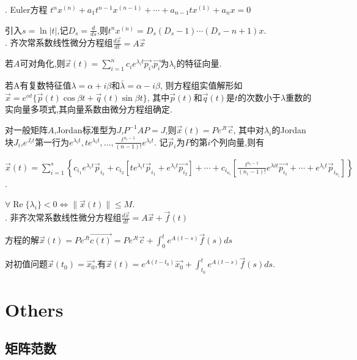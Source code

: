 \documentclass[UTF8]{ctexart}
\begin{document}
. Euler方程
$t^nx^{(n)}+a_1t^{n-1}x^{(n-1)}+\cdots +a_{n-1}tx^{(1)}+a_nx=0$ \par
引入$s=\ln |t|$,记$D_s=\frac{d}{ds}$,则$t^n x^{(n)}=D_s(D_s-1)\cdots (D_s-n+1)x$.
~\\

. 齐次常系数线性微分方程组$\frac{d\vec{x}}{dt}=A\vec{x} $ \par

若$A$可对角化,则$\vec{x}(t)=\sum _{i=1}^n c_i e^{\lambda_i t}\vec{p_i}$,$\vec{p_i}$为$\lambda_i$的特征向量. \par
若A有复数特征值$\lambda=\alpha+i\beta$和$\bar{\lambda}=\alpha-i\beta$,
则方程组实值解形如$\vec{x}=e^{\alpha t}\{\vec{p}(t) \cos \beta t+\vec{q}(t) \sin \beta t\}$,
其中$\vec{p}(t)$和$\vec{q}(t)$是$t$的次数小于$\lambda$重数的实向量多项式,其向量系数由微分方程组确定. \par

对一般矩阵$A$,Jordan标准型为$J$,$P^{-1}AP=J$,则$\vec{x}(t)=Pe^{Jt}\vec{c}$,
其中对$\lambda_i$的Jordan块$J_i$,$e^{J_it}$第一行为$e^{\lambda_it},te^{\lambda_it},\dots ,\frac{t^{n_i-1}}{(n-1)!}e^{\lambda_it}$.
记$\vec{p}_i$为$P$的第$i$个列向量,则有 \par
$\vec{x}(t)= \sum_{i=1}^{s}\left\{c_{i_1}e^{\lambda_it} \vec{p}_{i_1}+c_{i_2}\left[te^{\lambda_it} \vec{p}_{i_1}+e^{\lambda_it}\vec{p_{i_2}}\right]
	+\cdots+c_{i_{n_{i}}}\left[\frac{t^{n_{i}-1}}{\left(n_{i}-1\right)!} e^{\lambda i t} \vec{p_{i_1}}+\cdots+e^{\lambda_it} \vec{p}_{i_{n_{i}}}\right]\right\}$.\par
$\forall \operatorname{Re}\{\lambda_i\}<0 \Leftrightarrow \|\vec{x}(t)\| \leq M$.
~\\

. 非齐次常系数线性微分方程组$\frac{d\vec{x}}{dt}=A\vec{x} +\vec{f}(t)$ \par
方程的解$\vec{x}(t)=Pe^{Jt}\vec{c(t)}=Pe^{Jt}\vec{c}+\int_{0}^te^{A(t-s)}\vec{f}(s)ds$ \par
对初值问题$\vec{x}(t_0)=\vec{x_0}$,有$\vec{x}(t)=e^{A(t-t_0)}\vec{x_0}+\int_{t_0}^te^{A(t-s)}\vec{f}(s)ds$.
~\\


\section{Others}

\subsection{矩阵范数}
\end{document}
